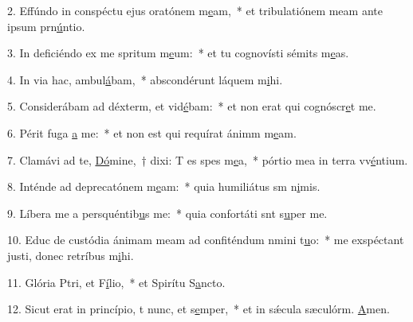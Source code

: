 2. Effúndo in conspéctu ejus oratónem m\uline{e}am,~* et tribulatiónem meam ante ipsum prn\uline{ú}ntio.\par 
3. In deficiéndo ex me spritum m\uline{e}um:~* et tu cognovísti sémits m\uline{e}as.\par 
4. In via hac,  ambul\uline{á}bam,~* abscondérunt láquem m\uline{i}hi.\par 
5. Considerábam ad déxterm, et vid\uline{é}bam:~* et non erat qui cognóscr\uline{e}t me.\par 
6. Périt fuga \uline{a} me:~* et non est qui requírat ánimm m\uline{e}am.\par 
7. Clamávi ad te, \uline{Dó}mine,~† dixi: T es spes m\uline{e}a,~* pórtio mea in terra vv\uline{é}ntium.\par 
8. Inténde ad deprecatónem m\uline{e}am:~* quia humiliátus sm n\uline{i}mis.\par 
9. Líbera me a persquéntib\uline{u}s me:~* quia confortáti snt s\uline{u}per me.\par 
10. Educ de custódia ánimam meam ad confiténdum nmini t\uline{u}o:~* me exspéctant justi, donec retríbus m\uline{i}hi.\par 
11. Glória Ptri, et F\uline{í}lio,~* et Spirítu S\uline{a}ncto.\par 
12. Sicut erat in princípio, t nunc, et s\uline{e}mper,~* et in sǽcula sæculórm. \uline{A}men.\par 
